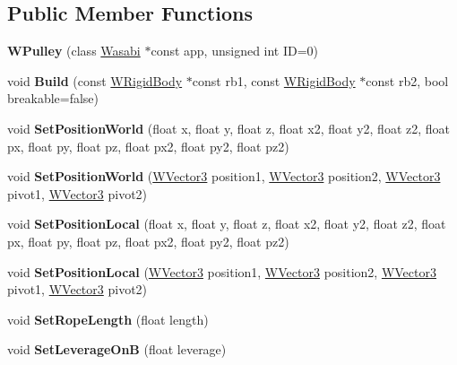 \subsection*{Public Member Functions}
\begin{DoxyCompactItemize}
\item 
{\bfseries W\+Pulley} (class \hyperlink{class_wasabi}{Wasabi} $\ast$const app, unsigned int ID=0)\hypertarget{class_w_pulley_ac187ddb1adc29ccd505203de88818fd4}{}\label{class_w_pulley_ac187ddb1adc29ccd505203de88818fd4}

\item 
void {\bfseries Build} (const \hyperlink{class_w_rigid_body}{W\+Rigid\+Body} $\ast$const rb1, const \hyperlink{class_w_rigid_body}{W\+Rigid\+Body} $\ast$const rb2, bool breakable=false)\hypertarget{class_w_pulley_a6539dc8b73cd681ad3b416a0f6329683}{}\label{class_w_pulley_a6539dc8b73cd681ad3b416a0f6329683}

\item 
void {\bfseries Set\+Position\+World} (float x, float y, float z, float x2, float y2, float z2, float px, float py, float pz, float px2, float py2, float pz2)\hypertarget{class_w_pulley_a1767d9b7294097853248a76f4928c07a}{}\label{class_w_pulley_a1767d9b7294097853248a76f4928c07a}

\item 
void {\bfseries Set\+Position\+World} (\hyperlink{class_w_vector3}{W\+Vector3} position1, \hyperlink{class_w_vector3}{W\+Vector3} position2, \hyperlink{class_w_vector3}{W\+Vector3} pivot1, \hyperlink{class_w_vector3}{W\+Vector3} pivot2)\hypertarget{class_w_pulley_a04ab7a05a4af59ca5a33c163517a3fd5}{}\label{class_w_pulley_a04ab7a05a4af59ca5a33c163517a3fd5}

\item 
void {\bfseries Set\+Position\+Local} (float x, float y, float z, float x2, float y2, float z2, float px, float py, float pz, float px2, float py2, float pz2)\hypertarget{class_w_pulley_a777773e11bdc7d127e53aa4f31be7856}{}\label{class_w_pulley_a777773e11bdc7d127e53aa4f31be7856}

\item 
void {\bfseries Set\+Position\+Local} (\hyperlink{class_w_vector3}{W\+Vector3} position1, \hyperlink{class_w_vector3}{W\+Vector3} position2, \hyperlink{class_w_vector3}{W\+Vector3} pivot1, \hyperlink{class_w_vector3}{W\+Vector3} pivot2)\hypertarget{class_w_pulley_a3cc5273a541b25c9f975b67f81d9e0bb}{}\label{class_w_pulley_a3cc5273a541b25c9f975b67f81d9e0bb}

\item 
void {\bfseries Set\+Rope\+Length} (float length)\hypertarget{class_w_pulley_adf9cd285e50bd6aa0b7d9b1b3a7f92bb}{}\label{class_w_pulley_adf9cd285e50bd6aa0b7d9b1b3a7f92bb}

\item 
void {\bfseries Set\+Leverage\+OnB} (float leverage)\hypertarget{class_w_pulley_a5149d3b06f6abdab3256741c563c02f5}{}\label{class_w_pulley_a5149d3b06f6abdab3256741c563c02f5}

\end{DoxyCompactItemize}
